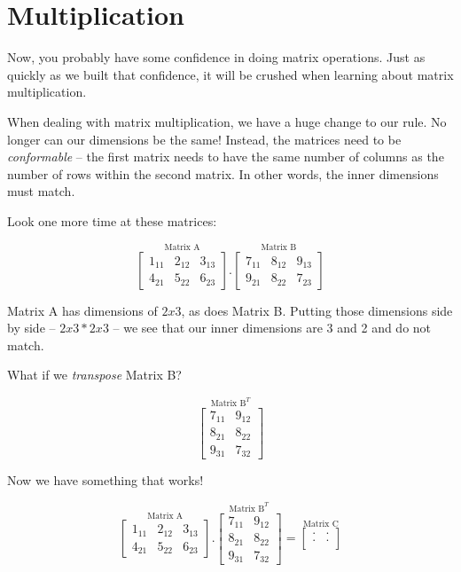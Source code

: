 \documentclass[
  letterpaper,
]{krantz}
\begin{document}
\section{Multiplication}\label{multiplication}

Now, you probably have some confidence in doing matrix operations. Just
as quickly as we built that confidence, it will be crushed when learning
about matrix multiplication.

When dealing with matrix multiplication, we have a huge change to our
rule. No longer can our dimensions be the same! Instead, the matrices
need to be \emph{conformable} -- the first matrix needs to have the same
number of columns as the number of rows within the second matrix. In
other words, the inner dimensions must match.

Look one more time at these matrices:

\[
\stackrel{\mbox{Matrix A}}{
\begin{bmatrix}
1_{11} & 2_{12} & 3_{13}\\
4_{21} & 5_{22} & 6_{23}
\end{bmatrix}
}
.
\stackrel{\mbox{Matrix B}}{
\begin{bmatrix}
7_{11} & 8_{12} & 9_{13}\\
9_{21} & 8_{22} & 7_{23}
\end{bmatrix} 
}
\]

Matrix A has dimensions of \(2x3\), as does Matrix B. Putting those
dimensions side by side -- \(2x3 * 2x3\) -- we see that our inner
dimensions are 3 and 2 and do not match.

What if we \emph{transpose} Matrix B?

\[
\stackrel{\mbox{Matrix B}^T}{
\begin{bmatrix}
7_{11} & 9_{12} \\ 
8_{21}& 8_{22}\\
9_{31} & 7_{32}
\end{bmatrix} 
}
\]

Now we have something that works!

\[
\stackrel{\mbox{Matrix A}}{
\begin{bmatrix}
1_{11} & 2_{12} & 3_{13}\\
4_{21} & 5_{22} & 6_{23}
\end{bmatrix}
}
.
\stackrel{\mbox{Matrix B}^T}{
\begin{bmatrix}
7_{11} & 9_{12} \\ 
8_{21}& 8_{22}\\
9_{31} & 7_{32}
\end{bmatrix} 
}
=
\stackrel{\mbox{Matrix C}}{
\begin{bmatrix}
. & . \\
. & . \\
\end{bmatrix}
}
\]
\end{document}
